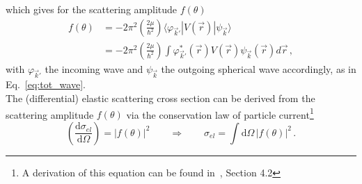 which gives for the scattering amplitude $f(\theta)$
\begin{equation}\label{eq:sc_amp_pot}
\begin{split}
f(\theta) & = -2\pi^2 \left( \frac{2\mu}{\hbar^2} \right) \langle \varphi_{\vec{k}'} | V(\vec{r}) | \psi_{\vec{k}} \rangle \\
 & = -2\pi^2 \left( \frac{2\mu}{\hbar^2} \right) \int \varphi_{\vec{k}'}^*(\vec{r}) V(\vec{r}) \psi_{\vec{k}}(\vec{r}) d\vec{r} \, ,
\end{split}
\end{equation}
with $\varphi_{\vec{k}'}$ the incoming wave and $\psi_{\vec{k}}$ the outgoing spherical wave accordingly, as in Eq.~\ref{eq:tot_wave}.\\
The (differential) elastic scattering cross section can be derived from the scattering amplitude $f(\theta)$ via the conservation law of particle current\footnote{A derivation of this equation can be found in~\cite{mayer2013kernphysik}, Section 4.2}
\begin{equation}\label{eq:el_scatt_cs}
\left( \frac{\mathrm{d} \sigma_{el}}{\mathrm{d} \Omega} \right) = |f(\theta)|^2 \qquad \Rightarrow \qquad \sigma_{el} = \int \mathrm{d} \Omega \, |f(\theta)|^2 \, .
\end{equation}

